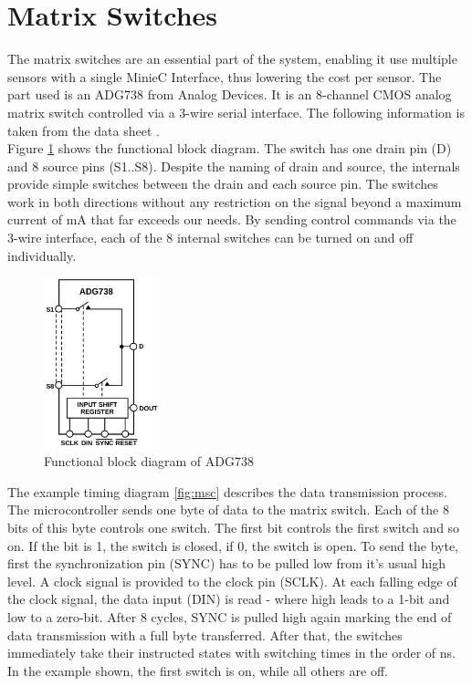 \section{Matrix Switches}

The matrix switches are an essential part of the system, enabling it use multiple sensors with a single MinieC Interface, thus lowering the cost per sensor. The part used is an ADG738 from Analog Devices. It is an 8-channel CMOS analog matrix switch controlled via a 3-wire serial interface. The following information is taken from the data sheet \cite{ms}.\\

Figure \ref{fig:ms} shows the functional block diagram. The switch has one drain pin (D) and 8 source pins (S1..S8). Despite the naming of drain and source, the internals provide simple switches between the drain and each source pin. The switches work in both directions without any restriction on the signal beyond a maximum current of \unit[120]{mA} that far exceeds our needs. By sending control commands via the 3-wire interface, each of the 8 internal switches can be turned on and off individually.\\

\begin{figure}
	\begin{center}
		\includegraphics[width=0.3\textwidth]{images/ms.pdf} 
		\caption{Functional block diagram of ADG738}
		\label{fig:ms}
	\end{center}
\end{figure}

The example timing diagram \ref{fig:msc} describes the data transmission process. The microcontroller sends one byte of data to the matrix switch. Each of the 8 bits of this byte controls one switch. The first bit controls the first switch and so on. If the bit is 1, the switch is closed, if 0, the switch is open. To send the byte, first the synchronization pin (SYNC) has to be pulled low from it's usual high level. A clock signal is provided to the clock pin (SCLK). At each falling edge of the clock signal, the data input (DIN) is read - where high leads to a 1-bit and low to a zero-bit. After 8 cycles, SYNC is pulled high again marking the end of data transmission with a full byte transferred. After that, the switches immediately take their instructed states with switching times in the order of \unit[100]{ns}. In the example shown, the first switch is on, while all others are off.\\

